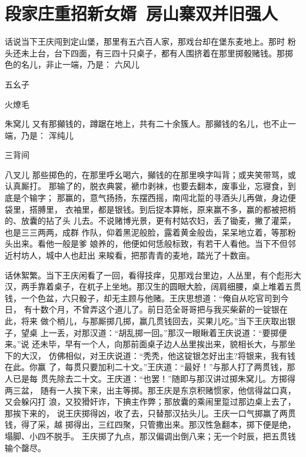 \chapter{段家庄重招新女婿~房山寨双并旧强人}

话说当下王庆闯到定山堡，那里有五六百人家，那戏台却在堡东麦地上。那时
粉头还未上台，台下四面，有三四十只桌子，都有人围挤着在那里掷骰赌钱。那掷
色的名儿，非止一端，乃是：
六风儿

五幺子

火燎毛

朱窝儿
又有那攧钱的，蹲踞在地上，共有二十余簇人。那攧钱的名儿，也不止一端，乃是：
浑纯儿

三背间

八叉儿
那些掷色的，在那里呼幺喝六，攧钱的在那里唤字叫背；或夹笑带骂，或认真厮打。
那输了的，脱衣典裳，褫巾剥袜，也要去翻本，废事业，忘寝食，到底是个输字；
那赢的，意气扬扬，东摆西摇，南闯北踅的寻酒头儿再做，身边便袋里，搭膊里，
衣袖里，都是银钱。到后捉本算帐，原来赢不多，赢的都被把梢的、放囊的拈了头
儿去。不说赌博光景，更有村姑农妇，丢了锄麦，撇了灌菜，也是三三两两，成群
作队，仰着黑泥般脸，露着黄金般齿，呆呆地立着，等那粉头出来。看他一般是爹
娘养的，他便如何恁般标致，有若干人看他。当下不但邻近村坊人，城中人也赶出
来睃看，把那青青的麦地，踏光了十数亩。

话休絮繁。当下王庆闲看了一回，看得技痒，见那戏台里边，人丛里，有个彪形大
汉，两手靠着桌子，在杌子上坐地。那汉生的圆眼大脸，阔肩细腰，桌上堆着五贯
钱，一个色盆，六只骰子，却无主顾与他赌。王庆思想道：“俺自从吃官司到今日，
有十数个月，不曾弄这个道儿了。前日范全哥哥把与我买柴薪的一锭银在此，将来
做个梢儿，与那厮掷几掷，赢几贯钱回去，买果儿吃。”当下王庆取出银子，望桌
上一丢，对那汉道：“胡乱掷一回。”那汉一眼瞅着王庆说道：“要掷便来。”说
还未毕，早有一个人，向那前面桌子边人丛里挨出来，貌相长大，与那坐下的大汉，
仿佛相似，对王庆说道：“秃秃，他这锭银怎好出主?将银来，我有钱在此。你赢
了，每贯只要加利二十文。”王庆道：“最好！”与那人打了两贯钱，那人已是每
贯先除去二十文。王庆道：“也罢！”随即与那汉讲过掷朱窝儿。方掷得两三盆，
随有一人挨下来，出主等掷。那王庆是东京积赌惯家，他信得盆口真，又会躲闪打
浪，又狡猾奸诈，下捵主作弊；那放囊的乘闹里踅过那边桌上去了，那挨下来的，
说王庆掷得凶，收了去，只替那汉拈头儿。王庆一口气掷赢了两贯钱，得了采，越
掷得出，三红四聚，只管撒出来。那汉性急翻本，掷下便是绝，塌脚、小四不脱手。
王庆掷了九点，那汉偏调出倒八来；无一个时辰，把五贯钱输个罄尽。

